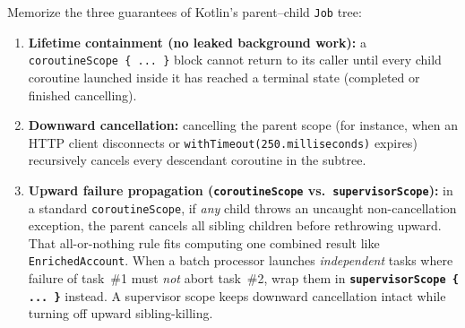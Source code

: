 Memorize the three guarantees of Kotlin's parent--child \texttt{Job} tree:
\begin{enumerate}
  \item \textbf{Lifetime containment (no leaked background work):} a \texttt{coroutineScope \{ ... \}} block cannot return to its caller until every child coroutine launched inside it has reached a terminal state (completed or finished cancelling).
  \item \textbf{Downward cancellation:} cancelling the parent scope (for instance, when an HTTP client disconnects or \texttt{withTimeout(250.milliseconds)} expires) recursively cancels every descendant coroutine in the subtree.
  \item \textbf{Upward failure propagation (\texttt{coroutineScope} vs.\ \texttt{supervisorScope}):} in a standard \texttt{coroutineScope}, if \emph{any} child throws an uncaught non-cancellation exception, the parent cancels all sibling children before rethrowing upward. That all-or-nothing rule fits computing one combined result like \texttt{EnrichedAccount}. When a batch processor launches \emph{independent} tasks where failure of task~\#1 must \emph{not} abort task~\#2, wrap them in \textbf{\texttt{supervisorScope \{ ... \}}} instead. A supervisor scope keeps downward cancellation intact while turning off upward sibling-killing.
\end{enumerate}


